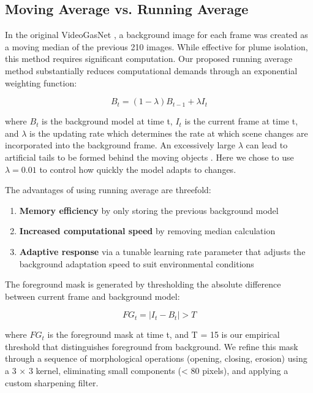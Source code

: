 \subsection{Moving Average vs. Running Average}

In the original VideoGasNet \cite{wang2022videogasnet}, a background image for each frame was created as a moving median of the previous 210 images. While effective for plume isolation, this method requires significant computation. Our proposed running average method substantially reduces computational demands through an exponential weighting function:

\begin{equation}
B_t = (1 - \lambda)B_{t-1} + \lambda I_t
\label{eq:running_average}
\end{equation}

where $B_t$ is the background model at time t, $I_t$ is the current frame at time t, and $\lambda$ is the updating rate which determines the rate at which scene changes are incorporated into the background frame. An excessively large $\lambda$ can lead to artificial tails to be formed behind the moving objects \cite{yi2010moving}. Here we chose to use $\lambda = 0.01$ to control how quickly the model adapts to changes.

The advantages of using running average are threefold:
\begin{enumerate}
\item \textbf{Memory efficiency} by only storing the previous background model
\item \textbf{Increased computational speed} by removing median calculation
\item \textbf{Adaptive response} via a tunable learning rate parameter that adjusts the background adaptation speed to suit environmental conditions
\end{enumerate}

The foreground mask is generated by thresholding the absolute difference between current frame and background model:

\begin{equation}
FG_t = |I_t - B_t| > T
\label{eq:foreground_mask}
\end{equation}

where $FG_t$ is the foreground mask at time t, and T = 15 is our empirical threshold that distinguishes foreground from background. We refine this mask through a sequence of morphological operations (opening, closing, erosion) using a 3 × 3 kernel, eliminating small components (< 80 pixels), and applying a custom sharpening filter.

